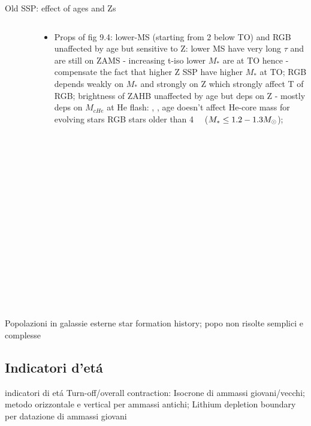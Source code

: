\begin{frame}{Old SSP: effect of ages and Zs}
\begin{columns}[T]
	\begin{column}{0.5\textwidth}
		\begin{figure}[!ht]
		\texttt{[image: SSP-HDRCMDZpoorMSHB]}
		\end{figure}
	\end{column}
	\begin{column}{0.40\textwidth}
		\begin{itemize}
			\item Props of fig 9.4: lower-MS (starting from \SI{2}{\mag} below TO) and RGB unaffected by age but sensitive to Z: lower MS have very long $\tau$ and are still on ZAMS - increasing t-iso lower $M_*$ are at TO hence  -   compensate the fact that higher Z SSP have higher $M_*$ at TO; RGB depends weakly on $M_*$ and strongly on Z which strongly affect T of RGB; brightness of ZAHB unaffected by age but deps on Z - mostly deps on $M_{cHe}$ at He flash: , , age doesn't affect He-core mass for evolving stars RGB stars older than \SI{4}{\giga\year} ($M_*\leq1.2-1.3M_{\odot}$);
		\end{itemize}
	\end{column}
\end{columns}
\end{frame}

\begin{frame}{Popolazioni in galassie esterne}
star formation history; popo non risolte semplici e complesse
\end{frame}

\subsection{Indicatori d'et\'a}

\begin{frame}{indicatori di et\'a}
Turn-off/overall contraction: Isocrone di ammassi giovani/vecchi; metodo orizzontale e vertical per ammassi antichi; Lithium depletion boundary per datazione di ammassi giovani
\end{frame}

